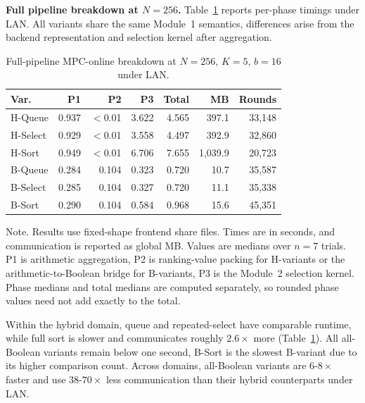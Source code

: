 \documentclass[conference,compsoc,letterpaper]{IEEEtran}
\theoremstyle{definition}
\theoremstyle{remark}
\newcommand{\scorebits}{b}
\newcommand{\HSort}{H-Sort}
\newcommand{\HQueue}{H-Queue}
\newcommand{\HSelect}{H-Select}
\newcommand{\BSort}{B-Sort}
\newcommand{\BQueue}{B-Queue}
\newcommand{\BSelect}{B-Select}
\begin{document}
\smallskip
\noindent\textbf{Full pipeline breakdown at $N=256$.}
Table~\ref{tab:full_pipeline} reports per-phase timings under LAN.
All variants share the same Module~1 semantics, differences arise from the backend representation and selection kernel after aggregation.
\begin{table}[t]
\centering
\small
\setlength{\tabcolsep}{3.5pt}
\renewcommand{\arraystretch}{1.08}
\caption{Full-pipeline MPC-online breakdown at $N=256$, $K=5$, $\scorebits=16$ under LAN.}
\label{tab:full_pipeline}
\begin{tabular}{@{}lrrrrrr@{}}
\toprule
\textbf{Var.} &
\textbf{P1} & \textbf{P2} & \textbf{P3} &
\textbf{Total} & \textbf{MB} & \textbf{Rounds} \\
\midrule
\HQueue{}  & 0.937 & $<$0.01 & 3.622 & 4.565 & 397.1     & 33{,}148 \\
\HSelect{} & 0.929 & $<$0.01 & 3.558 & 4.497 & 392.9     & 32{,}860 \\
\HSort{}   & 0.949 & $<$0.01 & 6.706 & 7.655 & 1{,}039.9 & 20{,}723 \\
\BQueue{}  & 0.284 & 0.104   & 0.323 & 0.720 & 10.7       & 35{,}587 \\
\BSelect{} & 0.285 & 0.104   & 0.327 & 0.720 & 11.1      & 35{,}338 \\
\BSort{}   & 0.290 & 0.104   & 0.584 & 0.968 & 15.6      & 45{,}351 \\
\bottomrule
\end{tabular}

\vspace{2pt}
\footnotesize
\parbox{\linewidth}{
{Note.} Results use fixed-shape frontend share files.
Times are in seconds, and communication is reported as global MB.
Values are medians over $n=7$ trials.
P1 is arithmetic aggregation, P2 is ranking-value packing for H-variants
or the arithmetic-to-Boolean bridge for B-variants, P3 is the Module~2
selection kernel.
Phase medians and total medians are computed separately, so rounded phase
values need not add exactly to the total.
}
\vspace{-3mm}
\end{table}
Within the hybrid domain, queue and repeated-select have comparable runtime, while full sort is slower and communicates roughly $2.6\times$ more (Table~\ref{tab:full_pipeline}).
All all-Boolean variants remain below one second, \BSort{} is the slowest B-variant due to its higher comparison count.
Across domains, all-Boolean variants are $6$-$8\times$ faster and use $38$-$70\times$ less communication than their hybrid counterparts under LAN.
\end{document}
